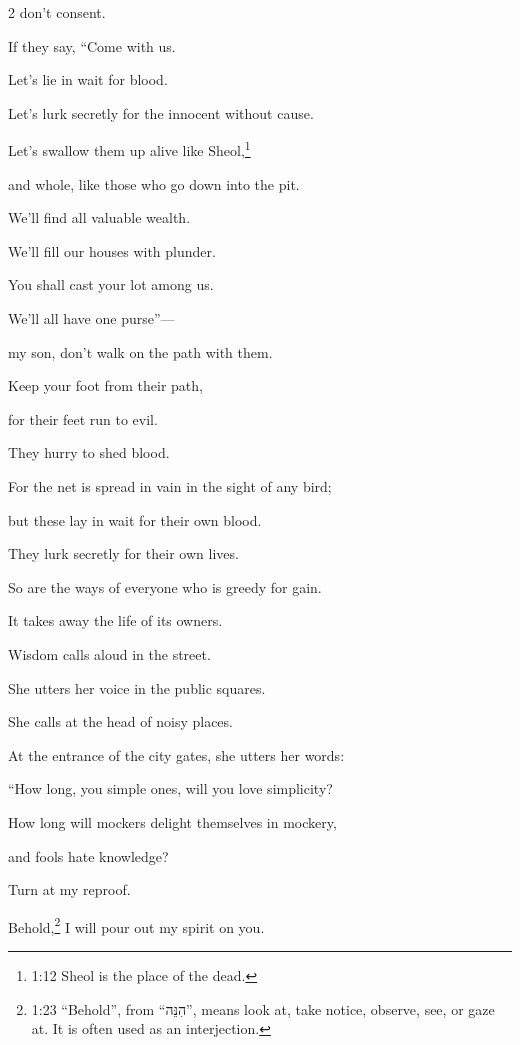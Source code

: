 \begin{multicols}{2}
don’t consent.


\myverse{}If they say, “Come with us.

Let’s lie in wait for blood.

Let’s lurk secretly for the innocent without cause.


\myverse{}Let’s swallow them up alive like Sheol,\footnote{1:12 Sheol is the place of the dead.}

and whole, like those who go down into the pit.


\myverse{}We’ll find all valuable wealth.

We’ll fill our houses with plunder.


\myverse{}You shall cast your lot among us.

We’ll all have one purse”—


\myverse{}my son, don’t walk on the path with them.

Keep your foot from their path,


\myverse{}for their feet run to evil.

They hurry to shed blood.


\myverse{}For the net is spread in vain in the sight of any bird;


\myverse{}but these lay in wait for their own blood.

They lurk secretly for their own lives.


\myverse{}So are the ways of everyone who is greedy for gain.

It takes away the life of its owners.


\vspace{\baselineskip} 
\myverse{}Wisdom calls aloud in the street.

She utters her voice in the public squares.


\myverse{}She calls at the head of noisy places.

At the entrance of the city gates, she utters her words:


\myverse{}“How long, you simple ones, will you love simplicity?

How long will mockers delight themselves in mockery,

and fools hate knowledge?


\myverse{}Turn at my reproof.

Behold,\footnote{1:23 “Behold”, from “הִנֵּה”, means look at, take notice, observe, see, or gaze at. It is
	often used as an interjection.} I will pour out my spirit on you.


\end{multicols}
